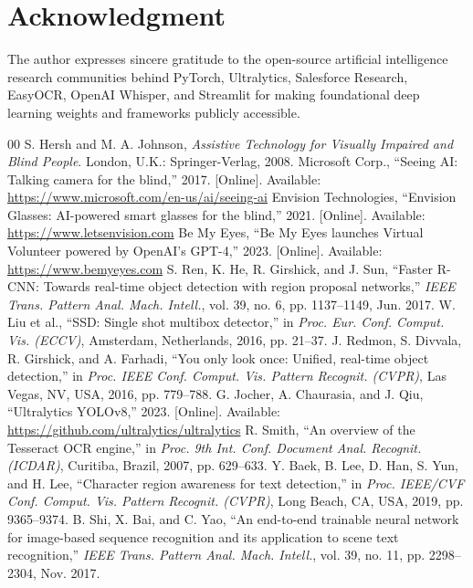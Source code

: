 \documentclass[conference]{IEEEtran}
\begin{document}
\section*{Acknowledgment}
The author expresses sincere gratitude to the open-source artificial intelligence research communities behind PyTorch, Ultralytics, Salesforce Research, EasyOCR, OpenAI Whisper, and Streamlit for making foundational deep learning weights and frameworks publicly accessible.

\begin{thebibliography}{00}
 S. Hersh and M. A. Johnson, \textit{Assistive Technology for Visually Impaired and Blind People}. London, U.K.: Springer-Verlag, 2008.
 Microsoft Corp., ``Seeing AI: Talking camera for the blind,'' 2017. [Online]. Available: \url{https://www.microsoft.com/en-us/ai/seeing-ai}
 Envision Technologies, ``Envision Glasses: AI-powered smart glasses for the blind,'' 2021. [Online]. Available: \url{https://www.letsenvision.com}
 Be My Eyes, ``Be My Eyes launches Virtual Volunteer powered by OpenAI's GPT-4,'' 2023. [Online]. Available: \url{https://www.bemyeyes.com}
 S. Ren, K. He, R. Girshick, and J. Sun, ``Faster R-CNN: Towards real-time object detection with region proposal networks,'' \textit{IEEE Trans. Pattern Anal. Mach. Intell.}, vol. 39, no. 6, pp. 1137--1149, Jun. 2017.
 W. Liu et al., ``SSD: Single shot multibox detector,'' in \textit{Proc. Eur. Conf. Comput. Vis. (ECCV)}, Amsterdam, Netherlands, 2016, pp. 21--37.
 J. Redmon, S. Divvala, R. Girshick, and A. Farhadi, ``You only look once: Unified, real-time object detection,'' in \textit{Proc. IEEE Conf. Comput. Vis. Pattern Recognit. (CVPR)}, Las Vegas, NV, USA, 2016, pp. 779--788.
 G. Jocher, A. Chaurasia, and J. Qiu, ``Ultralytics YOLOv8,'' 2023. [Online]. Available: \url{https://github.com/ultralytics/ultralytics}
 R. Smith, ``An overview of the Tesseract OCR engine,'' in \textit{Proc. 9th Int. Conf. Document Anal. Recognit. (ICDAR)}, Curitiba, Brazil, 2007, pp. 629--633.
 Y. Baek, B. Lee, D. Han, S. Yun, and H. Lee, ``Character region awareness for text detection,'' in \textit{Proc. IEEE/CVF Conf. Comput. Vis. Pattern Recognit. (CVPR)}, Long Beach, CA, USA, 2019, pp. 9365--9374.
 B. Shi, X. Bai, and C. Yao, ``An end-to-end trainable neural network for image-based sequence recognition and its application to scene text recognition,'' \textit{IEEE Trans. Pattern Anal. Mach. Intell.}, vol. 39, no. 11, pp. 2298--2304, Nov. 2017.

\end{thebibliography}
\end{document}
